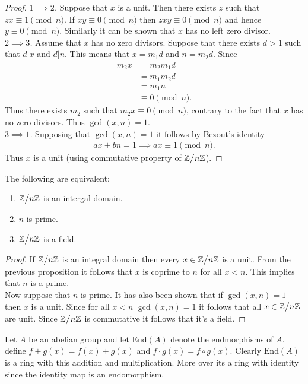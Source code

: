 \begin{proof}
  \textit{$1 \implies 2$.} Suppose that $x$ is a unit. Then there exists $z$ such that $zx\equiv 1 \pmod{n}$. If $xy \equiv 0 \pmod{n}$ then $zxy \equiv 0 \pmod{n}$ and hence $y\equiv 0\pmod{n}$. Similarly it can be shown that $x$ has no left zero divisor.\\
  \textit{$2 \implies 3$.} Assume that $x$ has no zero divisors. Suppose that there exists $d>1$ such that $d|x$ and $d|n$. This means that $x = m_1d$ and $n= m_2d$. Since
  \begin{align*}
    m_2 x &= m_2 m_1 d\\
         &= m_1 m_2 d\\
         &= m_1 n\\
         &\equiv 0\pmod{n}.
  \end{align*}
  Thus there exists $m_2$ such that $m_2 x \equiv 0\pmod{n}$, contrary to the fact that $x$ has no zero divisors. Thus $\gcd(x,n) = 1$.\\
  \textit{$3 \implies 1$.} Supposing that $\gcd(x,n)=1$ it follows by Bezout's identity
  \begin{align*}
    ax+bn =1 \implies ax \equiv 1 \pmod{n}.
  \end{align*}
  Thus $x$ is a unit (using commutative property of $\Z\bign/n\Z$).
\end{proof}
\begin{proposition}
  The following are equivalent:
  \begin{enumerate}
    \item $\Z\bign/n\Z$ is an intergal domain.
    \item $n$ is prime.
    \item $\Z\bign/n\Z$ is a field.
  \end{enumerate}
\end{proposition}
\begin{proof}
  If $\Z\bign/n\Z$ is an integral domain then every $x\in \Z\bign/n\Z$ is a unit. From the previous proposition it follows that $x$ is coprime to $n$ for all $x<n$. This implies that $n$ is a prime.\\ 

  Now suppose that $n$ is prime. It has also been shown that if $\gcd(x,n)=1$ then $x$ is a unit. Since for all $x<n$ $\gcd(x,n) = 1$ it follows that all $x\in \Z\bign/n\Z$ are unit. Since $\Z\bign/n\Z$ is commutative it follows that it's a field.
\end{proof}
\begin{example}
  Let $A$ be an abelian group and let $\text{End}(A)$ denote the endmorphisms of $A$. define $f+g(x) = f(x) + g(x)$ and $f\cdot g(x) = f\circ g(x)$. Clearly $\text{End}(A)$ is a ring with this addition and multiplication. More over its a ring with identity since the identity map is an endomorphism.
\end{example}
